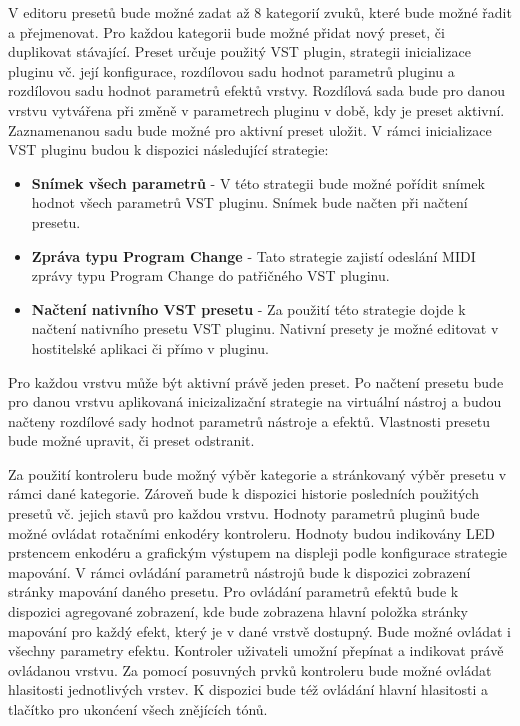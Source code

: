 \documentclass[thesis=M,czech]{FITthesis}[2019/03/06]
\begin{document}
		V editoru presetů bude možné zadat až 8 kategorií zvuků, které bude možné řadit a přejmenovat.
		Pro každou kategorii bude možné přidat nový preset, či duplikovat stávající. Preset určuje použitý VST plugin,
		strategii inicializace pluginu vč. její konfigurace, rozdílovou sadu hodnot parametrů pluginu a rozdílovou sadu hodnot parametrů efektů vrstvy.
		Rozdílová sada bude pro danou vrstvu vytvářena při změně v parametrech pluginu v době, kdy je preset aktivní. Zaznamenanou sadu bude možné pro aktivní preset uložit.
		V rámci inicializace VST pluginu budou k dispozici následující strategie:
		\begin{itemize}
			\item \textbf{Snímek všech parametrů} - V této strategii bude možné pořídit snímek hodnot všech parametrů VST pluginu. Snímek bude načten při načtení presetu.
			\item \textbf{Zpráva typu Program Change} - Tato strategie zajistí odeslání MIDI zprávy typu Program Change do patřičného VST pluginu.
			\item \textbf{Načtení nativního VST presetu} - Za použití této strategie dojde k načtení nativního presetu VST pluginu. Nativní presety je možné editovat
			v hostitelské aplikaci či přímo v pluginu.
		\end{itemize}
		Pro každou vrstvu může být aktivní právě jeden preset. Po načtení presetu bude 
		pro danou vrstvu aplikovaná inicizalizační strategie na virtuální nástroj a budou načteny rozdílové sady hodnot parametrů nástroje a efektů.
		Vlastnosti presetu bude možné upravit, či preset odstranit.
	
		Za použití kontroleru bude možný výběr kategorie a stránkovaný výběr presetu v rámci dané kategorie. Zároveň bude k dispozici
		historie posledních použitých presetů vč. jejich stavů pro každou vrstvu.
		Hodnoty parametrů pluginů bude možné ovládat rotačními enkodéry kontroleru. Hodnoty budou indikovány LED prstencem enkodéru a grafickým výstupem na displeji podle konfigurace strategie mapování.
		V rámci ovládání parametrů nástrojů bude k dispozici
		zobrazení stránky mapování daného presetu. Pro ovládání parametrů efektů bude k dispozici agregované zobrazení, kde bude zobrazena
		hlavní položka stránky mapování pro každý efekt, který je v dané vrstvě dostupný. Bude možné ovládat i všechny parametry efektu.
		Kontroler uživateli umožní přepínat a indikovat právě ovládanou vrstvu. 
		Za pomocí posuvných prvků kontroleru bude možné ovládat hlasitosti jednotlivých vrstev.
		K dispozici bude též ovládání hlavní hlasitosti a tlačítko pro ukonćení všech znějících tónů.
	
\end{document}
